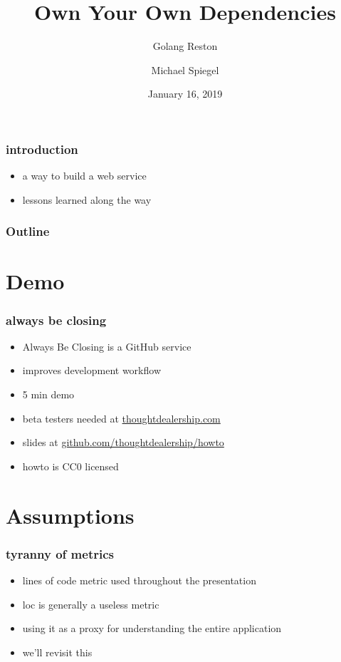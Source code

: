 \documentclass{beamer}
\title{Own Your Own Dependencies}
\subtitle{Golang Reston}
\author{Michael Spiegel}
\date{January 16, 2019}
\begin{document}
\begin{frame}
\titlepage
\end{frame}

\begin{frame}
\frametitle{introduction}
\begin{itemize}
\item a way to build a web service
\item lessons learned along the way
\end{itemize}
\end{frame}

\begin{frame}
\frametitle{Outline}
\tableofcontents
\end{frame}

\section{Demo}
\begin{frame}
\frametitle{always be closing}
\begin{itemize}
\item Always Be Closing is a GitHub service
\item improves development workflow
\item 5 min demo
\pause
\item beta testers needed at \href{https://thoughtdealership.com}{thoughtdealership.com}
\item slides at \href{https://github.com/thoughtdealership/howto}{github.com/thoughtdealership/howto}
\item howto is CC0 licensed
\end{itemize}
\end{frame}

\section{Assumptions}
\begin{frame}
\frametitle{tyranny of metrics}
\begin{itemize}
\item lines of code metric used throughout the presentation
\item loc is generally a useless metric
\item using it as a proxy for understanding the entire application
\item we'll revisit this
\end{itemize}
\end{frame}
\end{document}
